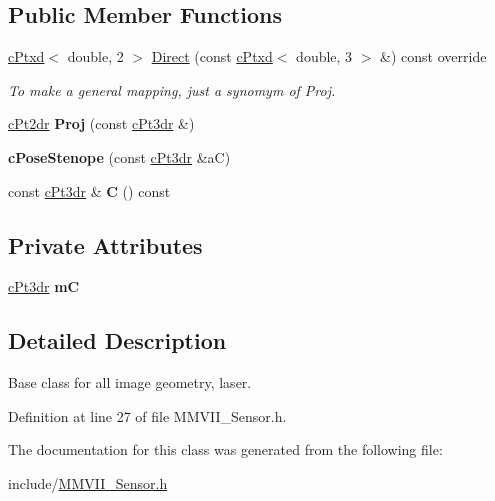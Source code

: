 \subsection*{Public Member Functions}
\begin{DoxyCompactItemize}
\item 
\hyperlink{classMMVII_1_1cPtxd}{c\+Ptxd}$<$ double, 2 $>$ \hyperlink{classMMVII_1_1cPoseStenope_a5ca0e3a65c2f38fe5b88cff19545e855}{Direct} (const \hyperlink{classMMVII_1_1cPtxd}{c\+Ptxd}$<$ double, 3 $>$ \&) const override\hypertarget{classMMVII_1_1cPoseStenope_a5ca0e3a65c2f38fe5b88cff19545e855}{}\label{classMMVII_1_1cPoseStenope_a5ca0e3a65c2f38fe5b88cff19545e855}

\begin{DoxyCompactList}\small\item\em To make a general mapping, just a synomym of Proj. \end{DoxyCompactList}\item 
\hyperlink{classMMVII_1_1cPt2d}{c\+Pt2dr} {\bfseries Proj} (const \hyperlink{classMMVII_1_1cPt3d}{c\+Pt3dr} \&)\hypertarget{classMMVII_1_1cPoseStenope_a92c16ae0d6be82474e052d5377e811e2}{}\label{classMMVII_1_1cPoseStenope_a92c16ae0d6be82474e052d5377e811e2}

\item 
{\bfseries c\+Pose\+Stenope} (const \hyperlink{classMMVII_1_1cPt3d}{c\+Pt3dr} \&aC)\hypertarget{classMMVII_1_1cPoseStenope_ad4d4f7a26d5fbb95a271fa89eccb1b43}{}\label{classMMVII_1_1cPoseStenope_ad4d4f7a26d5fbb95a271fa89eccb1b43}

\item 
const \hyperlink{classMMVII_1_1cPt3d}{c\+Pt3dr} \& {\bfseries C} () const \hypertarget{classMMVII_1_1cPoseStenope_a411a164c62b03d6bc9ec12189f0da103}{}\label{classMMVII_1_1cPoseStenope_a411a164c62b03d6bc9ec12189f0da103}

\end{DoxyCompactItemize}
\subsection*{Private Attributes}
\begin{DoxyCompactItemize}
\item 
\hyperlink{classMMVII_1_1cPt3d}{c\+Pt3dr} {\bfseries mC}\hypertarget{classMMVII_1_1cPoseStenope_a17a2f0cdb501cf4d7c35408d9feb70ad}{}\label{classMMVII_1_1cPoseStenope_a17a2f0cdb501cf4d7c35408d9feb70ad}

\end{DoxyCompactItemize}


\subsection{Detailed Description}
Base class for all image geometry, laser. 

Definition at line 27 of file M\+M\+V\+I\+I\+\_\+\+Sensor.\+h.



The documentation for this class was generated from the following file\+:\begin{DoxyCompactItemize}
\item 
include/\hyperlink{MMVII__Sensor_8h}{M\+M\+V\+I\+I\+\_\+\+Sensor.\+h}\end{DoxyCompactItemize}
